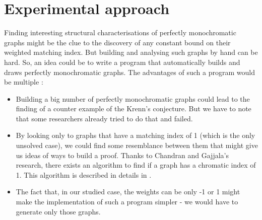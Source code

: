 \section{Experimental approach}

Finding interesting structural characterisations of perfectly monochromatic graphs might be the clue to the discovery of any constant bound on their weighted matching index. But building and analysing such graphs by hand can be hard. So, an idea could be to write a program that automatically builds and draws perfectly monochromatic graphs. The advantages of such a program would be multiple :

\begin{itemize}
    \item Building a big number of perfectly monochromatic graphs could lead to the finding of a counter example of the Krenn's conjecture. But we have to note that some researchers already tried to do that and failed.
    \item By looking only to graphs that have a matching index of 1 (which is the only unsolved case), we could find some resemblance between them that might give us ideas of ways to build a proof. Thanks to Chandran and Gajjala's research, there exists an algorithm to find if a graph has a chromatic index of 1. This algorithm is described in details in \cite{chandran}.
    \item The fact that, in our studied case, the weights can be only -1 or 1 might make the implementation of such a program simpler - we would have to generate only those graphs.
\end{itemize}
